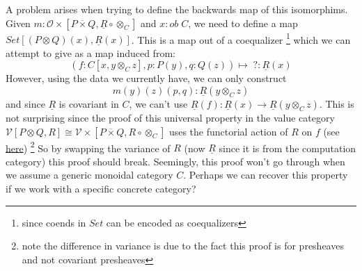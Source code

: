 \documentclass{article}
\begin{document}
A problem arises when trying to define the backwards map of this isomorphims. 
Given $m : \mathcal{O\times}[P \overline{\times} Q , \underline{R} \circ \otimes_C]$ and $x : ob \; C$, we need to define a map
$Set[(P \otimes Q)(x), \underline{R}(x)]$. This is a map out of a coequalizer 
\footnote{since coends in $Set$ can be encoded as coequalizers}
which we can attempt to give as a map induced from:
\[
    (f : C[x , y\otimes_C z] , p : P(y) , q : Q(z)) \mapsto \;? : \underline{R}(x)
\]
However, using the data we currently have, we can only construct
\[
    m(y)(z)(p,q) : \underline{R} (y \otimes_C z)    
\]
and since $\underline{R}$ is covariant in $C$, we can't use $\underline{R}(f) : \underline{R}(x) \rightarrow \underline{R}(y \otimes_C z)$.
This is not surprising since the proof of this universal property in the value category 
$\mathcal{V}[P \otimes Q , R] \cong \mathcal{V\times}[P \overline{\times} Q , R \circ \otimes_C]$
uses the functorial action of $R$ on $f$ 
(see \href{https://github.com/bond15/Bunched-CBPV/blob/d4de5ebe3a2a42499b24c13a8d2da7f3a2cc1b36/src/Data/BiDCC.agda#L120}{here})
\footnote{note the difference in variance is due to the fact this proof is for presheaves and not covariant presheaves}
So by swapping the variance of $R$ (now $\underline{R}$ since it is from the computation category) this proof should break.
Seemingly, this proof won't go through when we assume a generic monoidal category $C$. Perhaps we can recover this property if 
we work with a specific concrete category?
\end{document}
